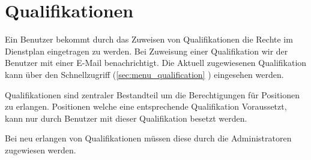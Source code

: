 \chapter{Qualifikationen}
\label{cha:qualification}
Ein Benutzer bekommt durch das Zuweisen von Qualifikationen die Rechte im Dienstplan eingetragen zu werden. Bei Zuweisung einer Qualifikation wir der Benutzer mit einer E-Mail benachrichtigt. Die Aktuell zugewiesenen Qualifikation kann über den Schnellzugriff (\ref{sec:menu_qualification} \textit{}) eingesehen werden.

\noindent Qualifikationen sind zentraler Bestandteil um die Berechtigungen für Positionen zu erlangen. Positionen welche eine entsprechende Qualifikation Voraussetzt, kann nur durch Benutzer mit dieser Qualifikation besetzt werden.

\noindent Bei neu erlangen von Qualifikationen müssen diese durch die Administratoren zugewiesen werden.